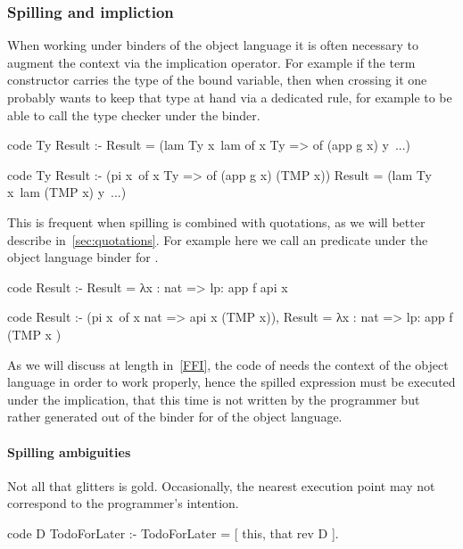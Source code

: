 \documentclass[a4paper, 11pt]{book}
\begin{document}
\subsubsection{Spilling and impliction}

When working under binders of the object language it is often
necessary to augment the context via
the implication operator. For example if the 
term constructor carries the type of the bound variable, then when
crossing it one probably wants to keep that type at hand via
a dedicated rule, for example to be able to call the type
checker under the binder.

\begin{elpicode}
  code Ty Result :- 
    Result = (lam Ty x\ lam {of x Ty => of (app g x)} y\ ...)

  code Ty Result :-
    (pi x\ of x Ty => of (app g x) (TMP x))
    Result = (lam Ty x\ lam (TMP x) y\ ...)
\end{elpicode}

\noindent
This is frequent when spilling is combined with quotations, as we
will better describe in~\cref{sec:quotations}. For example
here we call an predicate  under the object language binder
for .

\begin{elpicode}
  code Result :-
    Result = {{ λx : nat => lp:{{ app f {api x}  }}  }}

  code Result :-
    (pi x\ of x {{ nat }} => api x (TMP x)),
    Result = {{ λx : nat => lp:{{ app f (TMP {{ x }})  }}  }}
\end{elpicode}

\noindent
As we will discuss at length in~\cref{FFI}, the code of  needs the
context of the object language in order to work properly, hence the
spilled expression must be executed under the implication, that this time
is not written by the programmer but rather generated out of the binder
for  of the object language.

\paragraph{Spilling ambiguities}

Not all that glitters is gold. Occasionally, the nearest execution point may not
correspond to the programmer's intention.

\begin{elpicode}
  code D TodoForLater  :-
    TodoForLater = [ this, that {rev D} ].
\end{elpicode}
\end{document}
